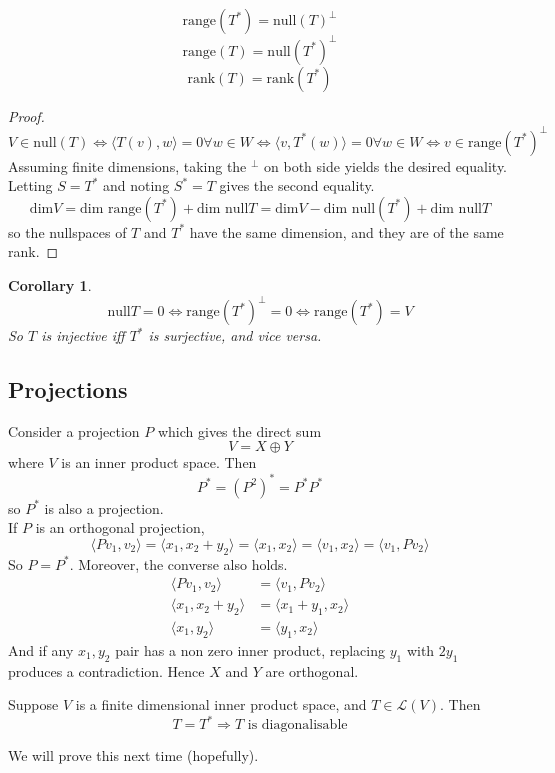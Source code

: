 \documentclass[12pt]{article}
\newtheorem{cor}{Corollary}[section]
\begin{document}
\begin{thm}
	$$\text{range}(T^*) = \text{null}(T)^\perp$$
	$$\text{range}(T) = \text{null}(T^*)^\perp$$
	$$\text{rank}(T) = \text{rank}(T^*)$$
\end{thm}

\begin{proof}
	$$V \in \text{null}(T) \Leftrightarrow \langle T(v),w \rangle = 0 \forall w \in W \Leftrightarrow \langle v,T^*(w) \rangle = 0 \forall w \in W \Leftrightarrow v \in \text{range}(T^*)^\perp$$
	Assuming finite dimensions, taking the $^\perp$ on both side yields the desired equality. Letting $S = T^*$ and noting $S^* = T$ gives the second equality.
	$$\text{dim}V = \text{dim range}(T^*) + \text{dim null}T = \text{dim}V - \text{dim null}(T^*) + \text{dim null}T$$
	so the nullspaces of $T$ and $T^*$ have the same dimension, and they are of the same rank.
\end{proof}

\begin{cor}
	$$\text{null}T = 0 \Leftrightarrow \text{range}(T^*)^\perp = 0 \Leftrightarrow \text{range}(T^*) = V$$
	So $T$ is injective iff $T^*$ is surjective, and vice versa.
\end{cor}

\subsection{Projections}

Consider a projection $P$ which gives the direct sum
$$V = X \oplus Y$$
where $V$ is an inner product space. Then
$$P^* = (P^2)^* = P^*P^*$$
so $P^*$ is also a projection. \\
If $P$ is an orthogonal projection,
$$\langle Pv_1, v_2 \rangle = \langle x_1,x_2+y_2 \rangle = \langle x_1,x_2 \rangle = \langle v_1,x_2 \rangle = \langle v_1,Pv_2 \rangle$$
So $P = P^*$. Moreover, the converse also holds.
\begin{align*}
	\langle Pv_1,v_2 \rangle &= \langle v_1,Pv_2 \rangle \\
	\langle x_1,x_2+y_2 \rangle &= \langle x_1+y_1,x_2 \rangle \\
	\langle x_1,y_2 \rangle &= \langle y_1,x_2 \rangle
\end{align*}
And if any $x_1,y_2$ pair has a non zero inner product, replacing $y_1$ with $2y_1$ produces a contradiction. Hence $X$ and $Y$ are orthogonal.

\begin{thm}
	Suppose $V$ is a finite dimensional inner product space, and $T \in \mathcal L(V)$. Then
	$$T = T^* \Rightarrow T \text{ is diagonalisable}$$
\end{thm}

We will prove this next time (hopefully).
\end{document}
